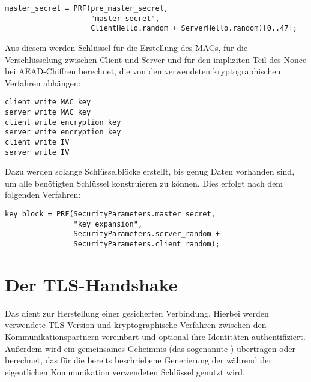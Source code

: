 \begin{lstlisting}
master_secret = PRF(pre_master_secret, 
					"master secret",
					ClientHello.random + ServerHello.random)[0..47];
\end{lstlisting}

Aus diesem \mastersecret{} werden Schlüssel für die Erstellung des MACs, für die Verschlüsselung zwischen Client und Server und für den impliziten Teil des Nonce bei AEAD-Chiffren berechnet, die von den verwendeten kryptographischen Verfahren abhängen:
\begin{lstlisting}
client write MAC key
server write MAC key
client write encryption key
server write encryption key
client write IV
server write IV
\end{lstlisting}

Dazu werden solange Schlüsselblöcke erstellt, bis genug Daten vorhanden sind, um alle benötigten Schlüssel konstruieren zu können. Dies erfolgt nach dem folgenden Verfahren:

\begin{lstlisting}
key_block = PRF(SecurityParameters.master_secret,
                "key expansion",
                SecurityParameters.server_random +
                SecurityParameters.client_random);
\end{lstlisting}


\section{Der TLS-Handshake}

\label{sec_tls_handshake}

Das \handshakeprotocol{} dient zur Herstellung einer gesicherten Verbindung. Hierbei werden verwendete TLS-Version und kryptographische Verfahren zwischen den Kommunikationspartnern vereinbart und optional ihre Identitäten authentifiziert. Außerdem wird ein gemeinsames Geheimnis (das sogenannte \premastersecret{})  übertragen oder berechnet, das für die bereits beschriebene Generierung der während der eigentlichen Kommunikation verwendeten Schlüssel genutzt wird.

